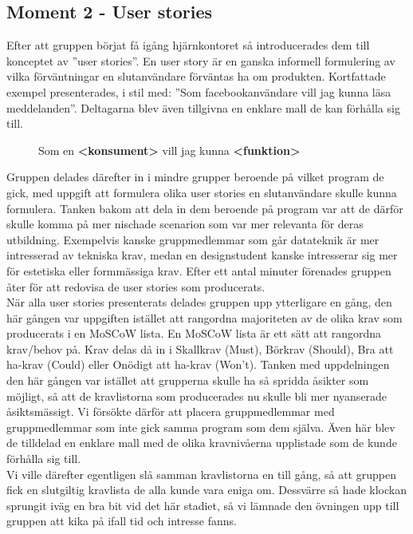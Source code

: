 \documentclass[a4paper, titlepage,12pt]{article}
\begin{document}
		\subsection{Moment 2 - User stories}
			Efter att gruppen börjat få igång hjärnkontoret så introducerades dem till konceptet av ''user stories''. En user story är en ganska informell formulering av vilka förväntningar en slutanvändare förväntas ha om produkten. Kortfattade exempel presenterades, i stil med: ''Som facebookanvändare vill jag kunna läsa meddelanden''. Deltagarna blev även tillgivna en enklare mall de kan förhålla sig till.

			\begin{figure}[h!]
				\begin{center}
				Som en \textbf{<konsument>} vill jag kunna \textbf{<funktion>}
				\end{center}
			\end{figure}

			Gruppen delades därefter in i mindre grupper beroende på vilket program de gick, med uppgift att formulera olika user stories en slutanvändare skulle kunna formulera. Tanken bakom att dela in dem beroende på program var att de därför skulle komma på mer nischade scenarion som var mer relevanta för deras utbildning. Exempelvis kanske gruppmedlemmar som går datateknik är mer intresserad av tekniska krav, medan en designstudent kanske intresserar sig mer för estetiska eller formmässiga krav. Efter ett antal minuter förenades gruppen åter för att redovisa de user stories som producerats.\\

			När alla user stories presenterats delades gruppen upp ytterligare en gång, den här gången var uppgiften istället att rangordna majoriteten av de olika krav som producerats i en MoSCoW lista. En MoSCoW lista är ett sätt att rangordna krav/behov på. Krav delas då in i Skallkrav (Must), Börkrav (Should), Bra att ha-krav (Could) eller Onödigt att ha-krav (Won't). Tanken med uppdelningen den här gången var istället att grupperna skulle ha så spridda åsikter som möjligt, så att de kravlistorna som producerades nu skulle bli mer nyanserade åsiktsmässigt. Vi försökte därför att placera gruppmedlemmar med gruppmedlemmar som inte gick samma program som dem själva. Även här blev de tilldelad en enklare mall med de olika kravnivåerna upplistade som de kunde förhålla sig till.\\

			Vi ville därefter egentligen slå samman kravlistorna en till gång, så att gruppen fick en slutgiltig kravlista de alla kunde vara eniga om. Dessvärre så hade klockan sprungit iväg en bra bit vid det här stadiet, så vi lämnade den övningen upp till gruppen att kika på ifall tid och intresse fanns.
\end{document}

